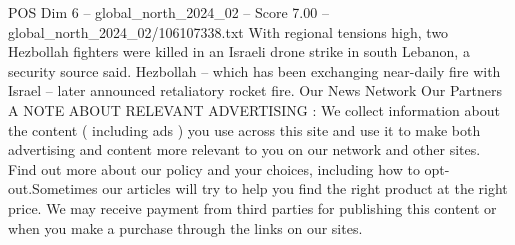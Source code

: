 \begin{textsample}{POS Dim 6 – global\_north\_2024\_02 – Score 7.00 – global\_north\_2024\_02/106107338.txt}
With regional tensions high, two Hezbollah fighters were killed in an Israeli drone strike in south Lebanon, a security source said.
Hezbollah -- which has been exchanging near-daily fire with Israel -- later announced retaliatory rocket fire.
Our News Network Our Partners A NOTE ABOUT RELEVANT ADVERTISING : We collect information about the content ( including ads ) you use across this site and use it to make both advertising and content more relevant to you on our network and other sites.
Find out more about our policy and your choices, including how to opt-out.Sometimes our articles will try to help you find the right product at the right price.
We may receive payment from third parties for publishing this content or when you make a purchase through the links on our sites.

\end{textsample}
